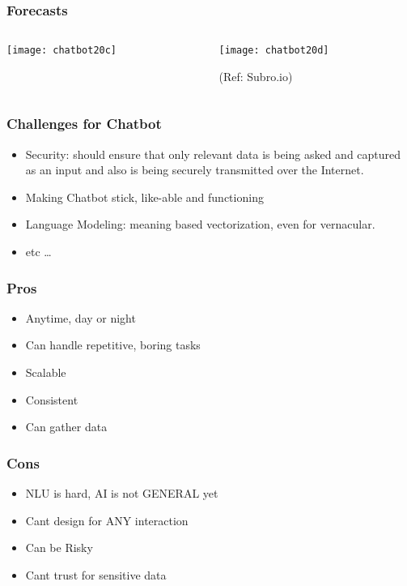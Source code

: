 \begin{frame}[fragile]\frametitle{Forecasts}

    \begin{columns}
    \begin{column}[t]{0.5\linewidth}
\begin{center}
\texttt{[image: chatbot20c]}

\end{center}
    \end{column}
    \begin{column}[t]{0.5\linewidth}
\begin{center}
\texttt{[image: chatbot20d]}

\end{center}

\tiny{(Ref: Subro.io)}
    \end{column}
  \end{columns}
  
 
\end{frame}

\begin{frame}[fragile]\frametitle{Challenges for Chatbot}

\begin{itemize}
\item Security:  should ensure that only relevant data is being asked and captured as an input and also is being securely transmitted over the Internet.
\item Making Chatbot stick, like-able and functioning
\item Language Modeling: meaning based vectorization, even for vernacular.
\item etc \ldots
\end{itemize}
\end{frame}

\begin{frame}[fragile]\frametitle{Pros}

	\begin{itemize}
	\item  Anytime, day or night	
	\item Can handle repetitive, boring tasks
	\item Scalable
	\item Consistent
	\item Can gather data
	\end{itemize}


\end{frame}

\begin{frame}[fragile]\frametitle{Cons}

	\begin{itemize}
	\item NLU is hard, AI is not GENERAL yet
	\item Cant design for ANY interaction
	\item Can be Risky
	\item Cant trust for sensitive data
	\end{itemize}


\end{frame}
